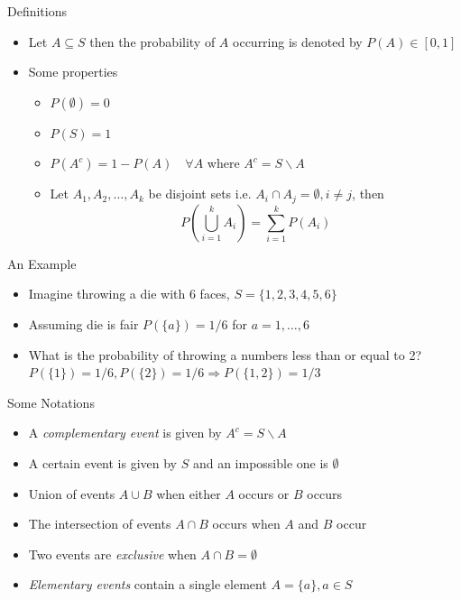 \documentclass{beamer}
\begin{document}
\begin{frame}{Definitions}
\begin{itemize}
 \item Let $A \subseteq S$ then the probability of $A$ occurring is denoted by $P(A) \in [0, 1]$
 \item Some properties 
 \begin{itemize}
 \item $P(\emptyset) = 0$
 \item $P(S) = 1$
 \item $P(A^c) = 1 - P(A) \quad \forall A$  where $A^c = S \backslash A$
 \item Let $A_1, A_2, \ldots, A_k$ be disjoint sets i.e. $A_i \cap A_j = \emptyset, i \neq j$, then 
 \begin{displaymath} 
  P\left(\bigcup_{i=1}^k A_i \right) = \sum_{i=1}^k P(A_i)
 \end{displaymath}
 \end{itemize} 
\end{itemize}
\end{frame}

\begin{frame}{An Example} 
\begin{itemize} 
 \item Imagine throwing a die with 6 faces, $S = \{1,2,3,4,5,6\}$
\item Assuming die is fair $P(\{a\}) = 1/6$ for $a = 1, \ldots, 6$
\item What is the probability of throwing a numbers less than or equal to 2? $P(\{1\}) = 1/6, P(\{2\}) = 1/6 \Rightarrow P(\{1, 2\}) = 1/3$
\end{itemize}
\end{frame}

\begin{frame}{Some Notations}  
\begin{itemize}
 \item A \emph{complementary event} is given by $A^c = S \backslash A$ 
\item A certain event is given by $S$ and an impossible one is $\emptyset$
\item Union of events $A \cup B$ when either $A$ occurs or $B$ occurs
\item The intersection of events $A \cap B$ occurs when $A$  and $B$ occur
\item Two events are \emph{exclusive} when $A \cap B = \emptyset$ 
\item \emph{Elementary events} contain a single element $A = \{a\}, a \in S$ 
\end{itemize} 
\end{frame}
\end{document}
